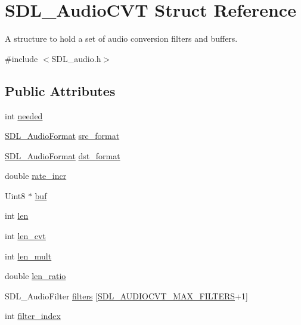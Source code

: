 \hypertarget{structSDL__AudioCVT}{}\section{S\+D\+L\+\_\+\+Audio\+C\+VT Struct Reference}
\label{structSDL__AudioCVT}


A structure to hold a set of audio conversion filters and buffers.  




{\ttfamily \#include $<$S\+D\+L\+\_\+audio.\+h$>$}

\subsection*{Public Attributes}
\begin{DoxyCompactItemize}
\item 
int \hyperlink{structSDL__AudioCVT_ac600a035a48df05e14d3712fd6953ad4}{needed}
\item 
\hyperlink{SDL__audio_8h_a491ed103fd25d920c4e6b7495217ce66}{S\+D\+L\+\_\+\+Audio\+Format} \hyperlink{structSDL__AudioCVT_a6ae81231e017105e6d5e745a51732e16}{src\+\_\+format}
\item 
\hyperlink{SDL__audio_8h_a491ed103fd25d920c4e6b7495217ce66}{S\+D\+L\+\_\+\+Audio\+Format} \hyperlink{structSDL__AudioCVT_a8f890d017be857a3b048bf00525736c6}{dst\+\_\+format}
\item 
double \hyperlink{structSDL__AudioCVT_ad886122c23a6673073baace31bff3b6c}{rate\+\_\+incr}
\item 
Uint8 $\ast$ \hyperlink{structSDL__AudioCVT_a080db27b929efa983c5161360ffce310}{buf}
\item 
int \hyperlink{structSDL__AudioCVT_aeaeb8c5a63c3ab96471fbfdf412c78ff}{len}
\item 
int \hyperlink{structSDL__AudioCVT_a5c60163f34d1947e5b166c23aba9879d}{len\+\_\+cvt}
\item 
int \hyperlink{structSDL__AudioCVT_ac9662d47cf2348b82b27b151150116b0}{len\+\_\+mult}
\item 
double \hyperlink{structSDL__AudioCVT_a5628ff5ccf711de9d77c0a4a9f57d2f0}{len\+\_\+ratio}
\item 
S\+D\+L\+\_\+\+Audio\+Filter \hyperlink{structSDL__AudioCVT_afeb8dc60716644de3b681653442de1db}{filters} \mbox{[}\hyperlink{SDL__audio_8h_a3d38380ac4a45a68a0e1c1a7a02bd290}{S\+D\+L\+\_\+\+A\+U\+D\+I\+O\+C\+V\+T\+\_\+\+M\+A\+X\+\_\+\+F\+I\+L\+T\+E\+RS}+1\mbox{]}
\item 
int \hyperlink{structSDL__AudioCVT_a35093b3ad3331c17416c593a76012b63}{filter\+\_\+index}
\end{DoxyCompactItemize}


